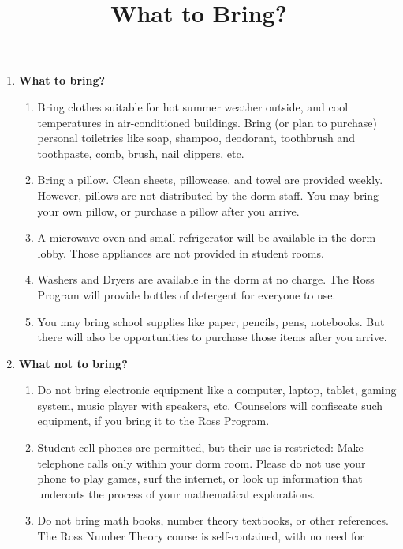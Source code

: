 \documentclass[11pt]{ross}
\title{What to Bring?}
\begin{document}
\maketitle
 \begin{enumerate}[label=(\arabic*),itemsep=2em,topsep=-1em]

\item \textbf{What to bring?}
 \begin{enumerate}[label=(\alph*),itemsep=0.5em,topsep=0em]
 \item Bring clothes suitable for hot summer weather outside, and cool
   temperatures in air-conditioned buildings.  Bring (or plan to
   purchase) personal toiletries like soap, shampoo, deodorant,
   toothbrush and toothpaste, comb, brush, nail clippers, etc.
 \item Bring a pillow.  Clean sheets, pillowcase, and towel are
   provided weekly.  However, pillows are not distributed by the dorm
   staff.  You may bring your own pillow, or purchase a
   pillow after you arrive.
 \item A microwave oven and small refrigerator will be available in
   the dorm lobby.  Those appliances are not provided in student
   rooms.
 \item Washers and Dryers are available in the dorm at no charge.  The
   Ross Program will provide bottles of detergent for everyone to use.
 \item You may bring school supplies like paper, pencils, pens,
   notebooks.  But there will also be opportunities to purchase those
   items after you arrive.
\end{enumerate}
\item \textbf{What not to bring?}
  \begin{enumerate}[label=(\alph*),itemsep=0.5em,topsep=0em]
  \item Do not bring electronic equipment like a computer, laptop,
    tablet, gaming system, music player with speakers, etc.  
    Counselors will confiscate such equipment, if you bring it to the
    Ross Program.
  \item Student cell phones are permitted, but their use is
    restricted: Make telephone calls only within your dorm room.
    Please do not use your phone to play games, surf the internet, or
    look up information that undercuts the process of your
    mathematical explorations.
  \item Do not bring math books, number theory textbooks, or other references.  
    The Ross Number Theory course is self-contained, with no need for 

\end{enumerate}
\end{enumerate}
\end{document}
